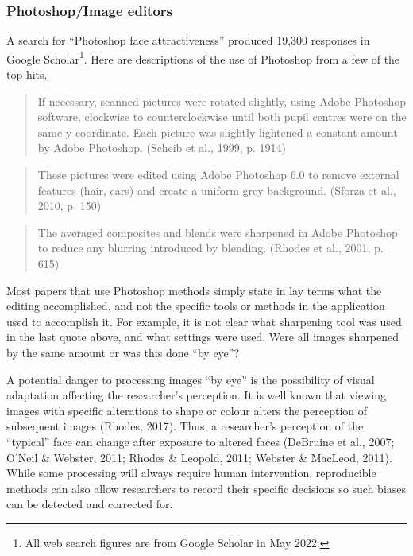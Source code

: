 \documentclass[
  man,floatsintext]{apa6}
\begin{document}
\hypertarget{photoshopimage-editors}{%
\subsubsection{Photoshop/Image editors}\label{photoshopimage-editors}}

A search for ``Photoshop face attractiveness'' produced 19,300 responses in Google Scholar\footnote{All web search figures are from Google Scholar in May 2022.}. Here are descriptions of the use of Photoshop from a few of the top hits.

\begin{quote}
If necessary, scanned pictures were rotated slightly, using Adobe Photoshop software, clockwise to counterclockwise until both pupil centres were on the same y-coordinate. Each picture was slightly lightened a constant amount by Adobe Photoshop. (Scheib et al., 1999, p. 1914)
\end{quote}

\begin{quote}
These pictures were edited using Adobe Photoshop 6.0 to remove external features (hair, ears) and create a uniform grey background. (Sforza et al., 2010, p. 150)
\end{quote}

\begin{quote}
The averaged composites and blends were sharpened in Adobe Photoshop to reduce any blurring introduced by blending. (Rhodes et al., 2001, p. 615)
\end{quote}

Most papers that use Photoshop methods simply state in lay terms what the editing accomplished, and not the specific tools or methods in the application used to accomplish it. For example, it is not clear what sharpening tool was used in the last quote above, and what settings were used. Were all images sharpened by the same amount or was this done ``by eye''?

A potential danger to processing images ``by eye'' is the possibility of visual adaptation affecting the researcher's perception. It is well known that viewing images with specific alterations to shape or colour alters the perception of subsequent images (Rhodes, 2017). Thus, a researcher's perception of the ``typical'' face can change after exposure to altered faces (DeBruine et al., 2007; O'Neil \& Webster, 2011; Rhodes \& Leopold, 2011; Webster \& MacLeod, 2011). While some processing will always require human intervention, reproducible methods can also allow researchers to record their specific decisions so such biases can be detected and corrected for.
\end{document}

